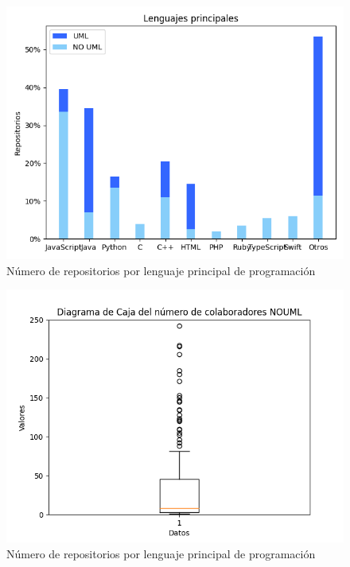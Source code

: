 \documentclass[a4paper, 12pt]{book}
\begin{document}
\begin{figure}
  \centering
  \includegraphics[width=12cm, keepaspectratio]{img/Figure_languages.png}
  \caption{Número de repositorios por lenguaje principal de programación}\label{fig:Figure_language}
\end{figure}

\begin{figure}
  \centering
  \includegraphics[width=12cm, keepaspectratio]{img/Figure_contributorsNOUML.png}
  \caption{Número de repositorios por lenguaje principal de programación}\label{fig:Figure_contributors_uml.png}
\end{figure}
\end{document}

